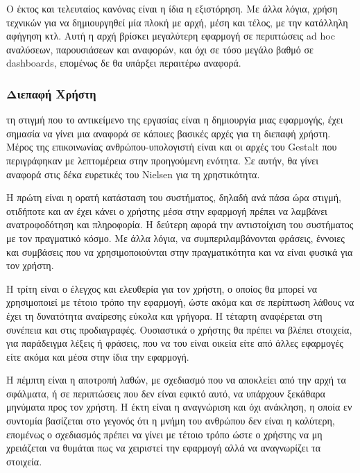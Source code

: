 \documentclass[greek, 12pt]{article}
\begin{document}
Ο έκτος και τελευταίος κανόνας είναι η ίδια η εξιστόρηση. Με άλλα λόγια, χρήση τεχνικών για να δημιουργηθεί μία πλοκή με αρχή, μέση και τέλος, με την κατάλληλη αφήγηση κτλ. \cite{knaflic2015storytelling} Αυτή η αρχή βρίσκει μεγαλύτερη εφαρμογή σε περιπτώσεις ad hoc αναλύσεων, παρουσιάσεων και αναφορών, και όχι σε τόσο μεγάλο βαθμό σε dashboards, επομένως δε θα υπάρξει περαιτέρω αναφορά.

\subsubsection{Διεπαφή Χρήστη}

 τη στιγμή που το αντικείμενο της εργασίας είναι η δημιουργία μιας εφαρμογής, έχει σημασία να γίνει μια αναφορά σε κάποιες βασικές αρχές για τη διεπαφή χρήστη. Μέρος της επικοινωνίας ανθρώπου-υπολογιστή είναι και οι αρχές του Gestalt που περιγράφηκαν με λεπτομέρεια στην προηγούμενη ενότητα. Σε αυτήν, θα γίνει αναφορά στις δέκα ευρετικές του Nielsen για τη χρηστικότητα. \cite{nielsen1994enhancing}

Η πρώτη είναι η ορατή κατάσταση του συστήματος, δηλαδή ανά πάσα ώρα στιγμή, οτιδήποτε και αν έχει κάνει ο χρήστης μέσα στην εφαρμογή πρέπει να λαμβάνει ανατροφοδότηση και πληροφορία. Η δεύτερη αφορά την αντιστοίχιση του συστήματος με τον πραγματικό κόσμο. Με άλλα λόγια, να συμπεριλαμβάνονται φράσεις, έννοιες και συμβάσεις που να χρησιμοποιούνται στην πραγματικότητα και να είναι φυσικά για τον χρήστη.

Η τρίτη είναι ο έλεγχος και ελευθερία για τον χρήστη, ο οποίος θα μπορεί να χρησιμοποιεί με τέτοιο τρόπο την εφαρμογή, ώστε ακόμα και σε περίπτωση λάθους να έχει τη δυνατότητα αναίρεσης εύκολα και γρήγορα. Η τέταρτη αναφέρεται στη συνέπεια και στις προδιαγραφές. Ουσιαστικά ο χρήστης θα πρέπει να βλέπει στοιχεία, για παράδειγμα λέξεις ή φράσεις, που να του είναι οικεία είτε από άλλες εφαρμογές είτε ακόμα και μέσα στην ίδια την εφαρμογή.

Η πέμπτη είναι η αποτροπή λαθών, με σχεδιασμό που να αποκλείει από την αρχή τα σφάλματα, ή σε περιπτώσεις που δεν είναι εφικτό αυτό, να υπάρχουν ξεκάθαρα μηνύματα προς τον χρήστη. Η έκτη είναι η αναγνώριση και όχι ανάκληση, η οποία εν συντομία βασίζεται στο γεγονός ότι η μνήμη του ανθρώπου δεν είναι η καλύτερη, επομένως ο σχεδιασμός πρέπει να γίνει με τέτοιο τρόπο ώστε ο χρήστης να μη χρειάζεται να θυμάται πως να χειριστεί την εφαρμογή αλλά να αναγνωρίζει τα στοιχεία.
\end{document}
